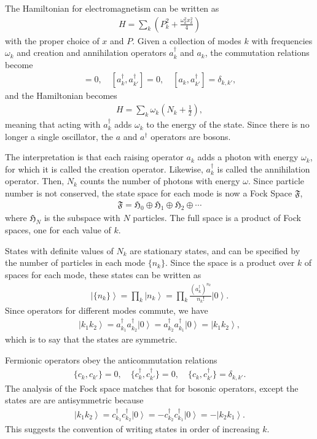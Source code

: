 \documentclass[12pt]{article} %
\renewcommand{\th}[1]{\frac{1}{#1}}
\newcommand{\om}{\omega}
\newcommand{\ket}[1]{\left|#1\right\rangle}
\begin{document}
The Hamiltonian for electromagnetism can be written as
\begin{align}
H = \sum_k \left(P_k^2 + \frac{\om_k^2x_k^2}{4}\right)
\end{align}
with the proper choice of $x$ and $P$. Given a collection of modes $k$ with frequencies $\om_k$ and creation and annihilation operators $a_k^\dag$ and $a_k$, the commutation relations become 
\begin{align}
[a_k, a_{k'}] = 0,\quad [a^\dag_k, a^\dag_{k'}]=0, \quad[a_k,a^\dag_{k'}] = 
	\delta_{k,k'},
\end{align}
and the Hamiltonian becomes
\begin{align}
H = \sum_k\om_k\left(N_k+\th{2}\right),
\end{align}
meaning that acting with $a_k^\dag$ adds $\om_k$ to the energy of the state. Since there is no longer a single oscillator, the $a$ and $a^\dag$ operators are bosons. 

The interpretation is that each raising operator $a_k$ adds a photon with energy $\om_k$, for which it is called the creation operator. Likewise, $a_k^\dag$ is called the annihilation operator. Then, $N_k$ counts the number of photons with energy $\om$. Since particle number is not conserved, the state space for each mode is now a  Fock Space $\mathfrak{F}$,
\begin{align}
\mathfrak{F} = \mathfrak{H}_0 \oplus \mathfrak{H}_1 \oplus \mathfrak{H}_2 
\oplus \cdots
\end{align}
where $\mathfrak{H}_N$ is the subspace with $N$ particles. The full space is a product of Fock spaces, one for each value of $k$.

States with definite values of $N_k$ are stationary states, and can be specified by the number of particles in each mode $\{n_k\}$. Since the space is a product over $k$ of spaces for each mode, these states can be written as
\begin{align}
\ket{\{n_k\}} = \prod_k\ket{n_k} = \prod_k\frac{(a_k^\dag)^{n_k}}{n_k!}\ket{0}.
\end{align}
Since operators for different modes commute, we have
\begin{align}
\ket{k_1k_2} = a^\dag_{k_1}a^\dag_{k_2}\ket{0} = a^\dag_{k_2} a^\dag_{k_1} \ket{0} = \ket{k_1k_2},
\end{align}
which is to say that the states are symmetric.

Fermionic operators obey the anticommutation relations
\begin{align}
\{c_k, c_{k'}\} = 0,\quad \{c^\dag_k, c^\dag_{k'}\} = 0,\quad \{c_k, c^\dag_{k'}\} = \delta_{k,k'}.
\end{align}
The analysis of the Fock space matches that for bosonic operators, except the states are are antisymmetric because
\begin{align}
\ket{k_1k_2} = c^\dag_{k_1}c^\dag_{k_2}\ket{0} = -c^\dag_{k_2}c^\dag_{k_1} 
	\ket{0} = -\ket{k_2k_1}.
\end{align}
This suggests the convention of writing states in order of increasing $k$.
\end{document}
